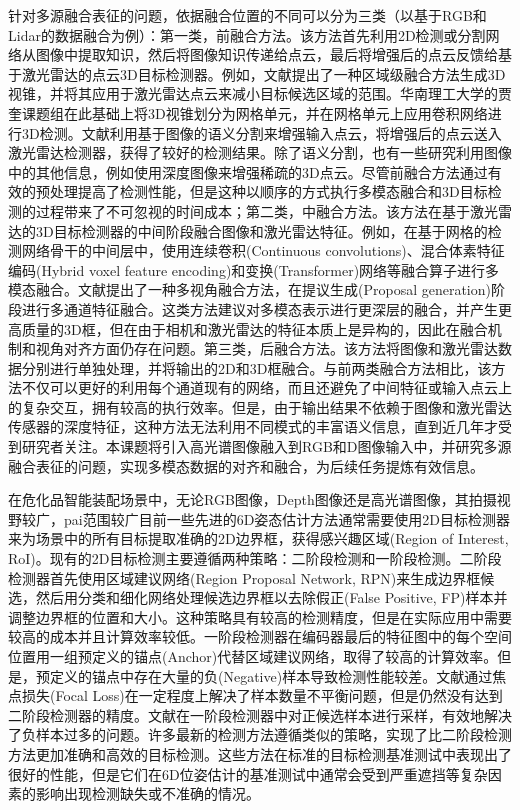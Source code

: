 \documentclass[12pt]{article}
\begin{document}
针对多源融合表征的问题，依据融合位置的不同可以分为三类（以基于RGB和Lidar的数据融合为例）：第一类，前融合方法。该方法首先利用2D检测或分割网络从图像中提取知识，然后将图像知识传递给点云，最后将增强后的点云反馈给基于激光雷达的点云3D目标检测器。例如，文献\cite{Qi2018}提出了一种区域级融合方法生成3D视锥，并将其应用于激光雷达点云来减小目标候选区域的范围。华南理工大学的贾奎课题组在此基础上将3D视锥划分为网格单元，并在网格单元上应用卷积网络进行3D检测\cite{Wang2019}。文献\cite{Vora2020}利用基于图像的语义分割来增强输入点云，将增强后的点云送入激光雷达检测器，获得了较好的检测结果。除了语义分割，也有一些研究利用图像中的其他信息，例如使用深度图像来增强稀疏的3D点云\cite{Yin2021}。尽管前融合方法通过有效的预处理提高了检测性能，但是这种以顺序的方式执行多模态融合和3D目标检测的过程带来了不可忽视的时间成本；第二类，中融合方法。该方法在基于激光雷达的3D目标检测器的中间阶段融合图像和激光雷达特征。例如，在基于网格的检测网络骨干的中间层中，使用连续卷积(Continuous convolutions)\cite{Liang2018,Liang2019}、混合体素特征编码(Hybrid voxel feature encoding)\cite{Sindagi2019}和变换(Transformer)\cite{Zhang2022}网络等融合算子进行多模态融合。文献\cite{Chen2017}提出了一种多视角融合方法，在提议生成(Proposal generation)阶段进行多通道特征融合。这类方法建议对多模态表示进行更深层的融合，并产生更高质量的3D框，但在由于相机和激光雷达的特征本质上是异构的，因此在融合机制和视角对齐方面仍存在问题。第三类，后融合方法。该方法将图像和激光雷达数据分别进行单独处理，并将输出的2D和3D框融合\cite{Asvadi2018}。与前两类融合方法相比，该方法不仅可以更好的利用每个通道现有的网络，而且还避免了中间特征或输入点云上的复杂交互，拥有较高的执行效率。但是，由于输出结果不依赖于图像和激光雷达传感器的深度特征，这种方法无法利用不同模式的丰富语义信息，直到近几年才受到研究者关注\cite{Pang2020}。本课题将引入高光谱图像融入到RGB和D图像输入中，并研究多源融合表征的问题，实现多模态数据的对齐和融合，为后续任务提炼有效信息。

在危化品智能装配场景中，无论RGB图像，Depth图像还是高光谱图像，其拍摄视野较广，pai范围较广目前一些先进的6D姿态估计方法\cite{Di2021,Cai2022,Haugaard2022}通常需要使用2D目标检测器来为场景中的所有目标提取准确的2D边界框，获得感兴趣区域(Region of Interest, RoI)。现有的2D目标检测主要遵循两种策略：二阶段检测和一阶段检测。二阶段检测器首先使用区域建议网络(Region Proposal Network, RPN)来生成边界框候选，然后用分类和细化网络处理候选边界框以去除假正(False Positive, FP)样本并调整边界框的位置和大小\cite{He2020,Ren2017}。这种策略具有较高的检测精度，但是在实际应用中需要较高的成本并且计算效率较低。一阶段检测器在编码器最后的特征图中的每个空间位置用一组预定义的锚点(Anchor)代替区域建议网络\cite{Redmon2016}，取得了较高的计算效率。但是，预定义的锚点中存在大量的负(Negative)样本导致检测性能较差。文献\cite{Lin2017}通过焦点损失(Focal Loss)在一定程度上解决了样本数量不平衡问题，但是仍然没有达到二阶段检测器的精度。文献\cite{Zhang2020}在一阶段检测器中对正候选样本进行采样，有效地解决了负样本过多的问题。许多最新的检测方法遵循类似的策略\cite{Tian2022,Ge2021}，实现了比二阶段检测方法更加准确和高效的目标检测。这些方法在标准的目标检测基准测试中表现出了很好的性能，但是它们在6D位姿估计的基准测试中通常会受到严重遮挡等复杂因素的影响出现检测缺失或不准确的情况。
\end{document}
